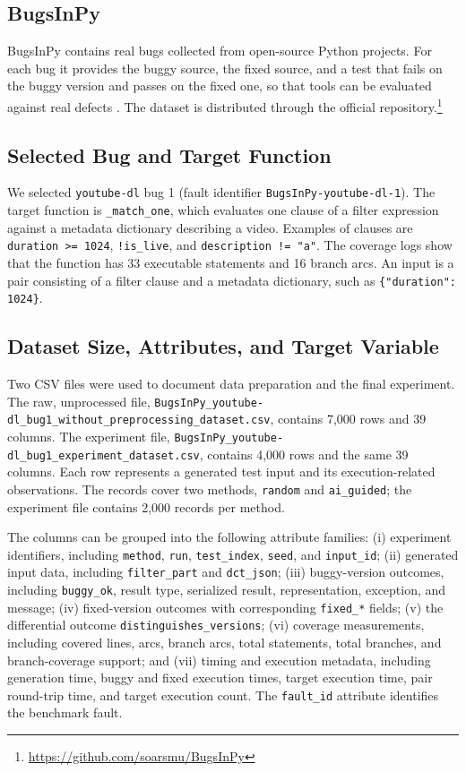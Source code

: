 \documentclass[12pt,onecolumn]{IEEEtran}
\begin{document}
\subsection{BugsInPy}

BugsInPy contains real bugs collected from open-source Python projects. For each bug it provides the buggy source, the fixed source, and a test that fails on the buggy version and passes on the fixed one, so that tools can be evaluated against real defects \cite{widyasari2020}. The dataset is distributed through the official repository.\footnote{\url{https://github.com/soarsmu/BugsInPy}}

\subsection{Selected Bug and Target Function}

We selected \texttt{youtube-dl} bug 1 (fault identifier \texttt{BugsInPy-youtube-dl-1}). The target function is \texttt{\_match\_one}, which evaluates one clause of a filter expression against a metadata dictionary describing a video. Examples of clauses are \texttt{duration >= 1024}, \texttt{!is\_live}, and \texttt{description != "a"}. The coverage logs show that the function has 33 executable statements and 16 branch arcs. An input is a pair consisting of a filter clause and a metadata dictionary, such as \texttt{\{"duration": 1024\}}.

\subsection{Dataset Size, Attributes, and Target Variable}

Two CSV files were used to document data preparation and the final experiment. The raw, unprocessed file, \texttt{BugsInPy\_youtube-dl\_bug1\_without\_preprocessing\_dataset.csv}, contains 7,000 rows and 39 columns. The experiment file, \texttt{BugsInPy\_youtube-dl\_bug1\_experiment\_dataset.csv}, contains 4,000 rows and the same 39 columns. Each row represents a generated test input and its execution-related observations. The records cover two methods, \texttt{random} and \texttt{ai\_guided}; the experiment file contains 2,000 records per method.

The columns can be grouped into the following attribute families: (i) experiment identifiers, including \texttt{method}, \texttt{run}, \texttt{test\_index}, \texttt{seed}, and \texttt{input\_id}; (ii) generated input data, including \texttt{filter\_part} and \texttt{dct\_json}; (iii) buggy-version outcomes, including \texttt{buggy\_ok}, result type, serialized result, representation, exception, and message; (iv) fixed-version outcomes with corresponding \texttt{fixed\_*} fields; (v) the differential outcome \texttt{distinguishes\_versions}; (vi) coverage measurements, including covered lines, arcs, branch arcs, total statements, total branches, and branch-coverage support; and (vii) timing and execution metadata, including generation time, buggy and fixed execution times, target execution time, pair round-trip time, and target execution count. The \texttt{fault\_id} attribute identifies the benchmark fault.
\end{document}
